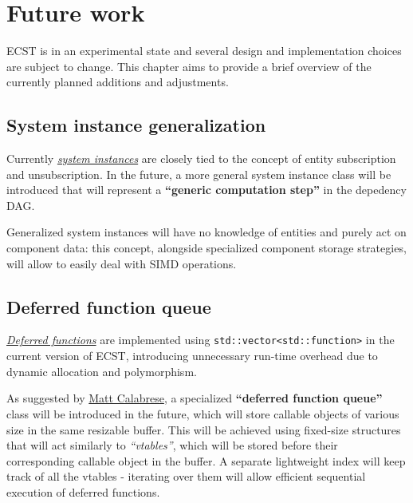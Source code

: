 \documentclass[oneside, 12pt, a4paper, openany]{book}
\begin{document}
\chapter{Future work}\label{future-work}

ECST is in an experimental state and several design and implementation
choices are subject to change. This chapter aims to provide a brief
overview of the currently planned additions and adjustments.

\section{System instance
generalization}\label{system-instance-generalization}

Currently \protect\hyperlink{storage_system}{\emph{system instances}}
are closely tied to the concept of entity subscription and
unsubscription. In the future, a more general system instance class will
be introduced that will represent a \textbf{``generic computation
step''} in the depedency DAG.

Generalized system instances will have no knowledge of entities and
purely act on component data: this concept, alongside specialized
component storage strategies, will allow to easily deal with SIMD
operations.

\section{Deferred function queue}\label{deferred-function-queue}

\protect\hyperlink{flow_exec_dfuncs}{\emph{Deferred functions}} are
implemented using
\texttt{std::vector<std::function>}
in the current version of ECST, introducing unnecessary run-time
overhead due to dynamic allocation and polymorphism.

As suggested by \href{https://twitter.com/cppsage}{Matt Calabrese}, a
specialized \textbf{``deferred function queue''} class will be
introduced in the future, which will store callable objects of various
size in the same resizable buffer. This will be achieved using
fixed-size structures that will act similarly to \emph{``vtables''},
which will be stored before their corresponding callable object in the
buffer. A separate lightweight index will keep track of all the vtables
- iterating over them will allow efficient sequential execution of
deferred functions.
\end{document}
